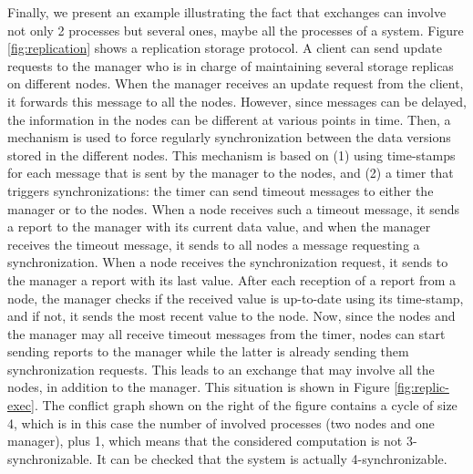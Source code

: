 %


Finally, we present an example illustrating the fact that exchanges can involve not only 2 processes but several ones, maybe all the processes of a system. Figure \ref{fig:replication} shows a replication storage protocol. A client can send update requests to the manager who is in charge of maintaining several storage replicas on different nodes. When the manager receives an update request from the client, it forwards this message to all the nodes. However, since messages can be delayed, the information in the nodes can be different at various points in time. Then, a mechanism is used to force regularly synchronization between the data versions stored in the different nodes. This mechanism is based on (1) using time-stamps for each message that is sent  by the manager to the nodes, and (2) a timer that triggers synchronizations: the timer can send timeout messages to either the manager or to the nodes. When a node receives such a timeout message, it sends a report to the manager with its current data value, and when the manager receives the timeout message, it sends to all nodes a message requesting a synchronization. When a node receives the synchronization request, it sends to the manager a report with its last value. After each reception of a report from a node, the manager checks if the received value is up-to-date using its time-stamp, and if not, it sends the most recent value to the node. Now, since the nodes and the manager may all receive timeout messages from the timer, nodes can start sending reports to the manager while the latter is already sending them synchronization requests. This leads to an exchange that may involve all the nodes, in addition to the manager. This situation is shown in Figure \ref{fig:replic-exec}. The conflict graph shown on the right of the figure contains a cycle of size 4, which is in this case the number of involved processes (two nodes and one manager), plus 1, which means that the considered computation is not 3-synchronizable. It can be checked that the system is actually 4-synchronizable. 

